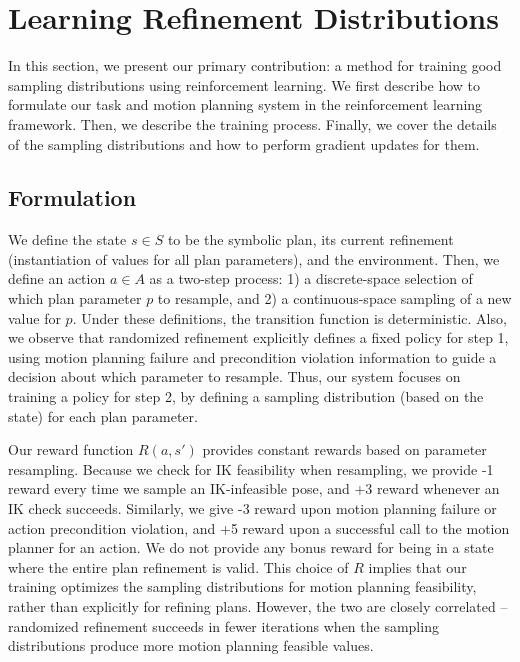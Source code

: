 \section{Learning Refinement Distributions}
In this section, we present our primary contribution: a method
for training good sampling distributions using reinforcement learning.
We first describe how to formulate our task and motion planning system
in the reinforcement learning framework. Then, we describe the training
process. Finally, we cover the details of the sampling distributions
and how to perform gradient updates for them.
\subsection{Formulation}
We define the state $s \in S$ to be the symbolic plan, its current refinement
(instantiation of values for all plan parameters), and the environment. Then, we define an action $a \in A$ as
a two-step process: 1) a discrete-space selection of which plan parameter $p$ to
resample, and 2) a continuous-space sampling of a new value for $p$. Under
these definitions, the transition function is deterministic. Also, we observe that
randomized refinement explicitly defines a fixed policy for
step 1, using motion planning failure and precondition violation information
to guide a decision about which parameter to resample. Thus, our system focuses
on training a policy for step 2, by defining a sampling distribution (based on the
state) for each plan parameter.

Our reward function $R(a, s')$ provides constant rewards based on parameter resampling.
Because we check for IK feasibility when resampling, we provide -1 reward every
time we sample an IK-infeasible pose, and +3 reward whenever an IK check succeeds.
Similarly, we give -3 reward upon motion planning failure or action precondition violation,
and +5 reward upon a successful call to the motion planner for an action. We do not
provide any bonus reward for being in a state where the entire plan refinement is valid.
This choice of $R$ implies that our training optimizes the sampling distributions for
motion planning feasibility, rather than explicitly for refining plans. However, the two are
closely correlated -- randomized refinement succeeds in fewer iterations when the sampling
distributions produce more motion planning feasible values.
